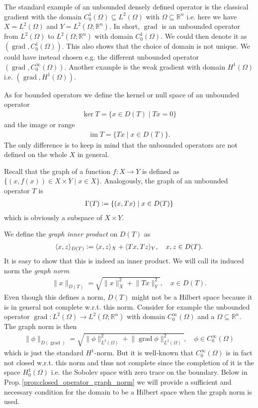 \documentclass[12pt,a4paper]{article}
\numberwithin{equation}{subsection}
\numberwithin{lemma}{subsection}
\theoremstyle{definition}
\DeclareMathOperator{\grad}{grad}
\DeclareMathOperator{\Ima}{im}
\newcommand{\real}{\mathbb{R}}
\begin{document}
The standard
example of an unbounded densely defined operator is the classical gradient with 
the domain $C_0^1(\Omega) \subseteq L^2 (\Omega)$ 
with $\Omega \subseteq \real^n$ i.e. here we have $X=L^2(\Omega)$ and 
$Y=L^2(\Omega;\real^n)$.
In short, $\grad$ is an unbounded operator from $L^2(\Omega)$ to 
$L^2(\Omega;\real^n)$ with domain $C_0^1(\Omega)$.
We could then denote it as $(\grad, C_0^1(\Omega))$. This also shows that 
the choice of domain is not unique. We could have instead chosen e.g. the 
different unbounded operator $(\grad, C_0^\infty (\Omega))$. 
Another example is the weak gradient with domain $H^1(\Omega)$ i.e.
$(\grad, H^1(\Omega))$.

As for bounded operators we define the kernel or null space of an unbounded
operator 
\begin{align*}
    \ker T = \{ x \in D(T) \mid Tx = 0\}
\end{align*}
and the image or range
\begin{align*}
    \Ima T = \{ Tx \mid x \in D(T)\}.
\end{align*}
The only difference is to keep in mind that the unbounded operators are not 
defined on the whole $X$ in general.

Recall that the graph of a function $f: X \rightarrow Y$ is defined 
as $\{ (x,f(x)) \in X \times Y \mid x \in X\}$. 
Analogously, the graph of an unbounded operator $T$ is 
\begin{align*}
    \Gamma(T) \vcentcolon= \{ (x,Tx) \mid x \in D(T) \}
\end{align*}
which is obviously a subspace of $X\times Y$.

We define the \textit{graph inner product} on $D(T)$ as 
\begin{align*}
    \langle x,z \rangle _{D(T)} 
    \vcentcolon= \langle x,z \rangle _X + \langle Tx, Tz \rangle _Y,
    \quad x,z \in D(T).
\end{align*}
It is easy to show that this is indeed an inner product. We will call its 
induced norm the \textit{graph norm}
\begin{align*}
    \lVert x \rVert _{D(T)} = \sqrt{ \lVert x \rVert^2 _X + \lVert Tx \rVert ^2 _Y}
    , \quad x\in D(T).
\end{align*}
Even though this defines a norm, $D(T)$ might not be a Hilbert space 
because it is in general not complete w.r.t. this norm. Consider for example 
the unbounded operator $\grad: L^2(\Omega) \rightarrow L^2(\Omega;\real^n)$ with 
domain $C_0^\infty(\Omega)$ and a $\Omega \subseteq \real^n$.
The graph norm is then
\begin{align*}
    \lVert \phi \rVert _{D(\grad)} 
    = \sqrt{ \lVert \phi \rVert^2 _{L^2(\Omega)} + \lVert \grad \phi \rVert^2 
        _{L^2(\Omega)}}
        , \quad \phi \in C_0^\infty(\Omega)
\end{align*}
which is just the standard $H^1$-norm.
But it is well-known that $C_0^\infty(\Omega)$ is in fact not closed 
w.r.t. this norm and thus not complete 
since the completion of it is the space $H^1_0(\Omega)$ i.e. 
the Sobolev space with zero trace on the boundary. 
Below in Prop.\,\ref{prop:closed_operator_graph_norm} we will provide a
sufficient and necessary condition for the domain to be a Hilbert space 
when the graph norm is used. 
\end{document}

